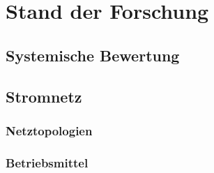 \chapter{Stand der Forschung}

\section{Systemische Bewertung}

\section{Stromnetz}

\subsection{Netztopologien}
\subsection{Betriebsmittel}
